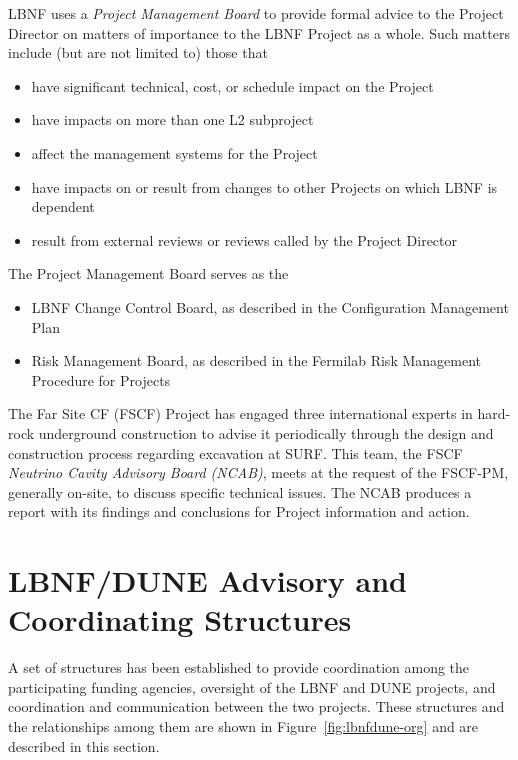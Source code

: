 LBNF uses a \textit{Project Management Board} to provide formal advice to the Project Director on matters of importance to the LBNF Project as a whole. Such matters include (but are not limited to) those that
\begin{itemize}
\item have significant technical, cost, or schedule impact on the Project
\item have impacts on more than one L2 subproject
\item affect the management systems for the Project
\item have impacts on or result from changes to other Projects on which LBNF is dependent
\item result from external reviews or reviews called by the Project Director
\end{itemize}

The Project Management Board serves as the
\begin{itemize}
\item LBNF Change Control Board, as described in the Configuration Management Plan\cite{CMP-10760} 
\item Risk Management Board, as described in the Fermilab Risk Management Procedure for Projects~\cite{fnal-risk-mgmt} %
\end{itemize}

The Far Site CF (FSCF) Project has engaged three international experts in hard-rock underground construction to advise it periodically through the design and construction process regarding excavation at SURF. This team, the FSCF \textit{Neutrino Cavity Advisory Board (NCAB)}, %
meets at the request of the FSCF-PM, generally on-site, to discuss specific technical issues. The NCAB produces a report with its findings and conclusions for Project information and action. 

\section{LBNF/DUNE Advisory and Coordinating Structures}
\label{sec:lbnf-dune-interface}

A set of structures has been established to provide coordination among the participating funding agencies, oversight of the LBNF and DUNE projects, and coordination and communication between the two projects.  These structures and the relationships among them are shown in Figure~\ref{fig:lbnfdune-org} and are described in this section.

